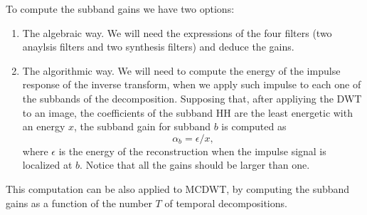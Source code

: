 To compute the subband gains we have two options:
\begin{enumerate}
\item The algebraic way. We will need the expressions of the four
  filters (two anaylsis filters and two synthesis filters) and deduce
  the gains.
\item The algorithmic way. We will need to compute the energy of the
  impulse response of the inverse transform, when we apply such
  impulse to each one of the subbands of the decomposition. Supposing
  that, after appliying the DWT to an image, the coefficients of the
  subband HH are the least energetic with an energy $x$, the subband
  gain for subband $b$ is computed as
  \begin{equation}
    \alpha_b = \epsilon/x,
  \end{equation} where $\epsilon$ is the
  energy of the reconstruction when the impulse signal is localized at
  $b$. Notice that all the gains should be larger than one.
\end{enumerate}

This computation can be also applied to MCDWT, by computing the subband
gains as a function of the number $T$ of temporal decompositions.
